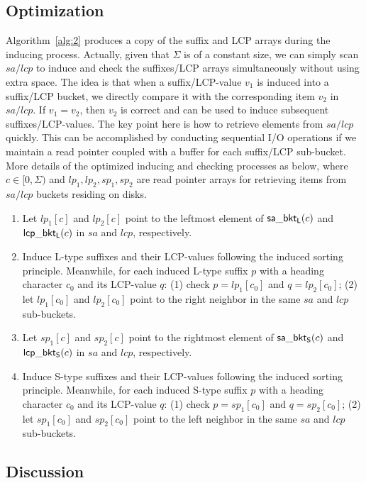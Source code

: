 \documentclass[10pt,journal,compsoc]{IEEEtran}
\begin{document}
\subsection{Optimization} \label{sec:method2:optimization}

Algorithm~\ref{alg:2} produces a copy of the suffix and LCP arrays during the inducing process. Actually, given that $\Sigma$ is of a constant size, we can simply scan $sa/lcp$ to induce and check the suffixes/LCP arrays simultaneously without using extra space. The idea is that when a suffix/LCP-value $v_1$ is induced into a suffix/LCP bucket, we directly compare it with the corresponding item $v_2$ in $sa/lcp$. If $v_1 = v_2$, then $v_2$ is correct and can be used to induce subsequent suffixes/LCP-values. The key point here is how to retrieve elements from $sa/lcp$ quickly. This can be accomplished by conducting sequential I/O operations if we maintain a read pointer coupled with a buffer for each suffix/LCP sub-bucket. More details of the optimized inducing and checking processes as below, where $c \in [0, \Sigma)$ and $lp_1, lp_2, sp_1, sp_2$ are read pointer arrays for retrieving items from $sa/lcp$ buckets residing on disks.

\begin{enumerate}
	\item [S1]
	Let $lp_1[c]$ and $lp_2[c]$ point to the leftmost element of ${\sf sa\_bkt_L}(c)$ and ${\sf lcp\_bkt_L}(c)$ in $sa$ and $lcp$, respectively.
	\item [S2]
	Induce L-type suffixes and their LCP-values following the induced sorting principle. Meanwhile, for each induced L-type suffix $p$ with a heading character $c_0$ and its LCP-value $q$: (1) check $p = lp_1[c_0]$ and $q = lp_2[c_0]$; (2) let $lp_1[c_0]$ and $lp_2[c_0]$ point to the right neighbor in the same $sa$ and $lcp$ sub-buckets.
	\item [S3]
	Let $sp_1[c]$ and $sp_2[c]$ point to the rightmost element of ${\sf sa\_bkt_S}(c)$ and ${\sf lcp\_bkt_S}(c)$ in $sa$ and $lcp$, respectively.
	\item [S4]
	Induce S-type suffixes and their LCP-values following the induced sorting principle. Meanwhile, for each induced S-type suffix $p$ with a heading character $c_0$ and its LCP-value $q$: (1) check $p = sp_1[c_0]$ and $q = sp_2[c_0]$; (2) let $sp_1[c_0]$ and $sp_2[c_0]$ point to the left neighbor in the same $sa$ and $lcp$ sub-buckets.
\end{enumerate}


\subsection{Discussion} \label{sec:method2:discussion}
\end{document}
